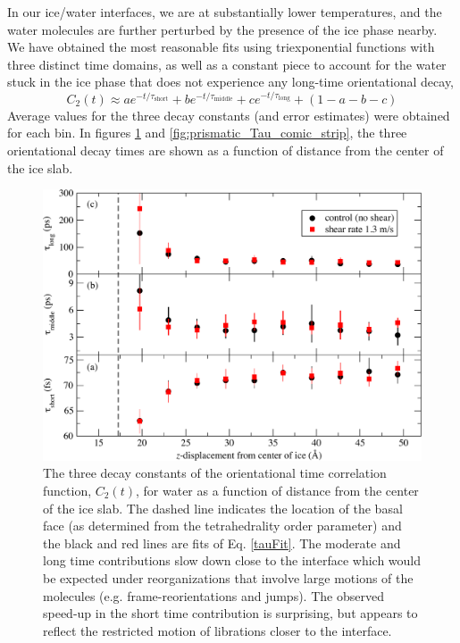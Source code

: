 \documentclass[11pt]{article}
\begin{document}
\begin{doublespace}
In our ice/water interfaces, we are at substantially lower
temperatures, and the water molecules are further perturbed by the
presence of the ice phase nearby.  We have obtained the most
reasonable fits using triexponential functions with three distinct
time domains, as well as a constant piece to account for the water
stuck in the ice phase that does not experience any long-time
orientational decay,
\begin{equation}
C_{2}(t) \approx a e^{-t/\tau_\mathrm{short}} + b e^{-t/\tau_\mathrm{middle}} + c
e^{-t/\tau_\mathrm{long}} + (1-a-b-c)
\end{equation}
Average values for the three decay constants (and error estimates)
were obtained for each bin. In figures \ref{fig:basal_Tau_comic_strip}
and \ref{fig:prismatic_Tau_comic_strip}, the three orientational decay
times are shown as a function of distance from the center of the ice
slab.

\begin{figure}
\includegraphics[width=\linewidth]{basal_Tau_comic_strip}
\caption{\label{fig:basal_Tau_comic_strip} The three decay constants
  of the orientational time correlation function, $C_2(t)$, for water
  as a function of distance from the center of the ice slab.  The
  dashed line indicates the location of the basal face (as determined
  from the tetrahedrality order parameter) and the black and red lines
  are fits of Eq. \ref{tauFit}.  The moderate and long
  time contributions slow down close to the interface which would be
  expected under reorganizations that involve large motions of the
  molecules (e.g. frame-reorientations and jumps).  The observed
  speed-up in the short time contribution is surprising, but appears
  to reflect the restricted motion of librations closer to the
  interface.}
\end{figure}


\end{doublespace}
\end{document}
